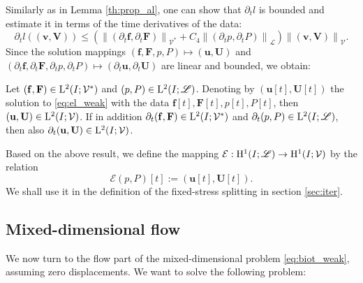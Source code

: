 \documentclass[a4paper]{m2an}
\numberwithin{equation}{section}
\def\dt{\prtl_t}
\def\FF{\vc F}
\def\ff{\vc f}
\def\Hf{\mathscr{L}} %
\def\norm#1{\left\|#1\right\|}
\def\prtl{\partial}
\def\U{\vc U}
\def\uu{\vc u}
\def\V{\vc V}
\def\Vel{{\vc{\mathcal V}}} %
\def\vc#1{\mathbf{#1}}     %
\def\vv{\vc v}
\newcommand{\eqs}[1]{\begin{equation*}#1\end{equation*}}
\begin{document}
Similarly as in Lemma \ref{th:prop_al}, one can show that $\dt l$ is bounded and estimate it in terms of the time derivatives of the data:
\eqs{ \dt l((\vv,\V)) \le \left(\norm{(\dt\ff,\dt\FF)}_{\Vel^*} + C_4\norm{(\dt p,\dt P)}_\Hf\right)\norm{(\vv,\V)}_\Vel. }
Since the solution mappings $(\ff,\FF,p,P) \mapsto (\uu, \U)$ and $(\dt\ff,\dt\FF,\dt p,\dt P)\mapsto(\dt\uu,\dt\U)$ are linear and bounded, we obtain:
\begin{crllr}
Let $(\ff,\FF)\in \xLtwo(I;\Vel^*)$ and $(p,P)\in \xLtwo(I;\Hf)$.
Denoting by $(\uu[t],\U[t])$ the solution to \eqref{eq:el_weak} with the data $\ff[t],\FF[t],p[t],P[t]$, then $(\uu,\U)\in \xLtwo(I;\Vel)$.
If in addition $\dt(\ff,\FF)\in \xLtwo(I;\Vel^*)$ and $\dt(p,P)\in \xLtwo(I;\Hf)$, then also $\dt(\uu,\U)\in \xLtwo(I;\Vel)$.
\end{crllr}
% 
Based on the above result, we define the mapping $\mathcal E: \xHone(I;\Hf)\to \xHone(I;\Vel)$ by the relation
\eqs{ \mathcal E(p,P)[t] := (\uu[t],\U[t]). }
We shall use it in the definition of the fixed-stress splitting in section \ref{sec:iter}.


\subsection{Mixed-dimensional flow}\label{sec:wellposedness_flow}

We now turn to the flow part of the mixed-dimensional problem \eqref{eq:biot_weak}, assuming zero displacements.
We want to solve the following problem:
\end{document}
